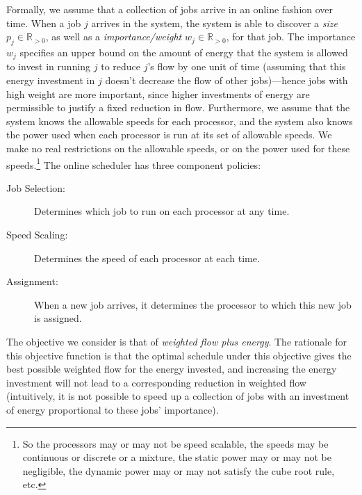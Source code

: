 \documentclass[11pt]{article}
\newcommand{\R}{{\mathbb R}}
\begin{document}
Formally, we assume that a collection of jobs arrive in an online
fashion over time. When a job $j$ arrives in the system, the system is
able to discover a \emph{size} $p_j \in \R_{> 0}$, as well as a
\emph{importance/weight} $w_j \in \R_{> 0}$, for that job. The
importance $w_j$ specifies an upper bound on the amount of energy that
the system is allowed to invest in running $j$ to reduce $j$'s flow by
one unit of time (assuming that this energy investment in $j$ doesn't
decrease the flow of other jobs)---hence jobs with high weight are more
important, since higher investments of energy are permissible to justify
a fixed reduction in flow. Furthermore, we assume that the system knows the
allowable speeds for each processor, and the system also knows the
power used when each processor is run at its
set of allowable speeds.  We make no real restrictions on the allowable speeds,
or on the power used for these speeds.\footnote{So the processors may or
  may not be speed scalable, the speeds may be continuous or discrete or
  a mixture, the static power may or may not be negligible, the dynamic
  power may or may not satisfy the cube root rule, etc.}  The online
scheduler has three component policies:
\begin{description}
\item[Job Selection:] Determines which job to run on each processor at any time.
\item[Speed Scaling:]Determines the speed of each processor at each time.
\item[Assignment:] When a new job arrives, it determines the processor
to which this new job is assigned.
\end{description}


The objective we consider is that of \emph{weighted flow plus energy}.
The rationale for this objective function is that the optimal schedule
under this objective gives the best possible weighted flow for the
energy invested, and increasing the energy investment will not lead to a
corresponding reduction in weighted flow (intuitively, it is not
possible to speed up a collection of jobs with an investment of energy
proportional to these jobs' importance).
\end{document}
